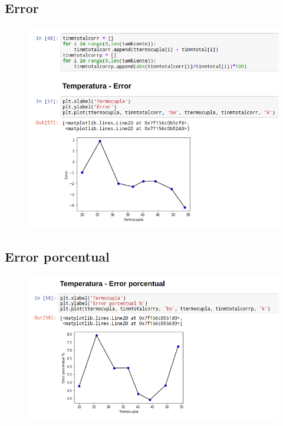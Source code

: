 \documentclass[a4paper,11pt]{report}
\begin{document}
\subsection{Error}
\begin{figure}[H]
\includegraphics[scale=0.62]{ptotal2.png}
\end{figure}
\subsection{Error porcentual}
\begin{figure}[H]
\includegraphics[scale=0.52]{ptotal3.png}
\end{figure}
\end{document}
